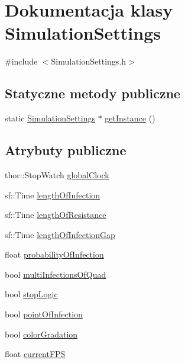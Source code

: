 \hypertarget{class_simulation_settings}{}\section{Dokumentacja klasy Simulation\+Settings}
\label{class_simulation_settings}


{\ttfamily \#include $<$Simulation\+Settings.\+h$>$}

\subsection*{Statyczne metody publiczne}
\begin{DoxyCompactItemize}
\item 
static \mbox{\hyperlink{class_simulation_settings}{Simulation\+Settings}} $\ast$ \mbox{\hyperlink{class_simulation_settings_ab69bcd8bb611656b17d1f655d09a3004}{get\+Instance}} ()
\end{DoxyCompactItemize}
\subsection*{Atrybuty publiczne}
\begin{DoxyCompactItemize}
\item 
thor\+::\+Stop\+Watch \mbox{\hyperlink{class_simulation_settings_acc1792d778ba9cd1d88d5e86a23373fb}{global\+Clock}}
\item 
sf\+::\+Time \mbox{\hyperlink{class_simulation_settings_a9a2b45617e4b4899da8af7905fa75a40}{length\+Of\+Infection}}
\item 
sf\+::\+Time \mbox{\hyperlink{class_simulation_settings_a1c7091242ba583df542bd22643ccc509}{length\+Of\+Resistance}}
\item 
sf\+::\+Time \mbox{\hyperlink{class_simulation_settings_a0d1b39d5cc136b5a3db2ddf61e4a055d}{length\+Of\+Infection\+Gap}}
\item 
float \mbox{\hyperlink{class_simulation_settings_a340d245affa1454fb60ddead2d2e133b}{probability\+Of\+Infection}}
\item 
bool \mbox{\hyperlink{class_simulation_settings_ad283e14644ea7fc2dc2713841cd2620f}{multi\+Infections\+Of\+Quad}}
\item 
bool \mbox{\hyperlink{class_simulation_settings_a5196bd793ff7383a45fe9d4041cc0e97}{stop\+Logic}}
\item 
bool \mbox{\hyperlink{class_simulation_settings_a3cf918e098904961a658c38047f607fd}{point\+Of\+Infection}}
\item 
bool \mbox{\hyperlink{class_simulation_settings_a131a5c0b576e510b4c61c3c19b0efe81}{color\+Gradation}}
\item 
float \mbox{\hyperlink{class_simulation_settings_a12861fbda2986c211cdeb3a59e38040b}{current\+F\+PS}}
\end{DoxyCompactItemize}

